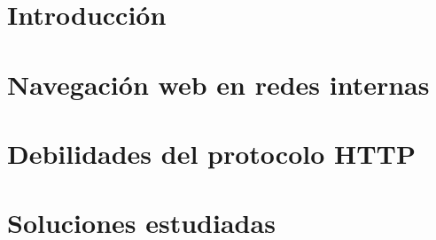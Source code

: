 \documentclass[12pt,twoside]{book}
\begin{document}
\nocite{*}

\frontmatter\pagestyle{empty}

\begin{titlepage}

\end{titlepage}

\begin{titlepage}

\end{titlepage}



\tableofcontents

\mainmatter\pagestyle{headings}


\chapter{Introducción}
    \label{capIntro}



\chapter{Navegación web en redes internas} 
    \label{capImp}



\chapter{Debilidades del protocolo HTTP} 
    \label{capDesc}



\chapter{Soluciones estudiadas}
    \label{capVirtu}




%



%


%
\end{document}
